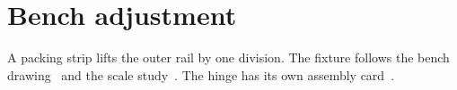 \documentclass{article}
\begin{document}
\section*{Bench adjustment}
A packing strip lifts the outer rail by one division.
The fixture follows the bench drawing~\cite{bench} and the scale study~\cite{scale}. The hinge has its own assembly card~\cite{flap}.
\nocite{atlas,guide,lining}

\end{document}
